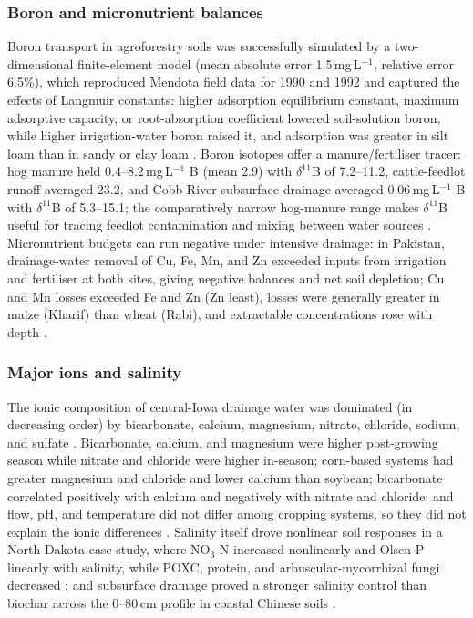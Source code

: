\documentclass[11pt]{article}
\begin{document}
\subsubsection{Boron and micronutrient balances}
Boron transport in agroforestry soils was successfully simulated by a two-dimensional finite-element model (mean absolute error 1.5\,mg\,L$^{-1}$, relative error 6.5\%), which reproduced Mendota field data for 1990 and 1992 and captured the effects of Langmuir constants: higher adsorption equilibrium constant, maximum adsorptive capacity, or root-absorption coefficient lowered soil-solution boron, while higher irrigation-water boron raised it, and adsorption was greater in silt loam than in sandy or clay loam \parencite{Tayfur2010}. Boron isotopes offer a manure/fertiliser tracer: hog manure held 0.4--8.2\,mg\,L$^{-1}$ B (mean 2.9) with $\delta^{11}$B of 7.2--11.2\textperthousand, cattle-feedlot runoff averaged 23.2\textperthousand, and Cobb River subsurface drainage averaged 0.06\,mg\,L$^{-1}$ B with $\delta^{11}$B of 5.3--15.1\textperthousand; the comparatively narrow hog-manure range makes $\delta^{11}$B useful for tracing feedlot contamination and mixing between water sources \parencite{Komor1997}. Micronutrient budgets can run negative under intensive drainage: in Pakistan, drainage-water removal of Cu, Fe, Mn, and Zn exceeded inputs from irrigation and fertiliser at both sites, giving negative balances and net soil depletion; Cu and Mn losses exceeded Fe and Zn (Zn least), losses were generally greater in maize (Kharif) than wheat (Rabi), and extractable concentrations rose with depth \parencite{Gul2013}.

\subsubsection{Major ions and salinity}
The ionic composition of central-Iowa drainage water was dominated (in decreasing order) by bicarbonate, calcium, magnesium, nitrate, chloride, sodium, and sulfate \parencite{Zimmerman2017b}. Bicarbonate, calcium, and magnesium were higher post-growing season while nitrate and chloride were higher in-season; corn-based systems had greater magnesium and chloride and lower calcium than soybean; bicarbonate correlated positively with calcium and negatively with nitrate and chloride; and flow, pH, and temperature did not differ among cropping systems, so they did not explain the ionic differences \parencite{Zimmerman2017b}. Salinity itself drove nonlinear soil responses in a North Dakota case study, where NO$_3$-N increased nonlinearly and Olsen-P linearly with salinity, while POXC, protein, and arbuscular-mycorrhizal fungi decreased \parencite{Daigh2025}; and subsurface drainage proved a stronger salinity control than biochar across the 0--80\,cm profile in coastal Chinese soils \parencite{Liu2025f}.
\end{document}
